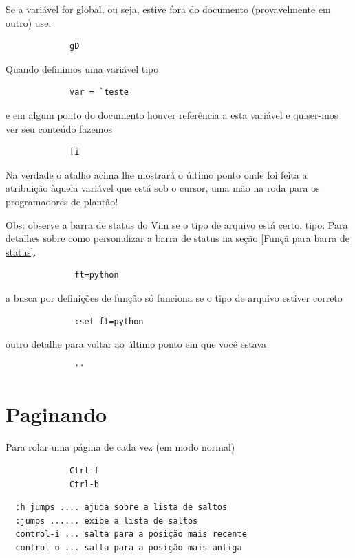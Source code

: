 \documentclass[10pt,a4paper,openany]{book}
\begin{document}
Se a variável for global, ou seja, estive fora do documento
(provavelmente em outro) use:

\begin{verbatim}
			 gD
\end{verbatim}

Quando definimos uma variável tipo

\begin{verbatim}
			 var = `teste'
\end{verbatim}

e em algum ponto do documento houver referência a esta variável e
quiser-mos ver seu conteúdo fazemos

\begin{verbatim}
			 [i
\end{verbatim}
Na verdade o atalho acima lhe mostrará o último ponto onde foi feita
a atribuição àquela variável que está sob o cursor, uma mão na roda
para os programadores de plantão!

Obs: observe a  barra de status do Vim se o tipo de arquivo está certo,
tipo. Para detalhes sobre como personalizar a barra de status na seção
\ref{Funçã para barra de status}.

\begin{verbatim}
			  ft=python
\end{verbatim}

a busca por definições de função só funciona se o tipo de arquivo
estiver correto

\begin{verbatim}
			  :set ft=python
\end{verbatim}

outro detalhe para voltar ao último ponto em que você estava

\begin{verbatim}
			  ''
\end{verbatim}

\section{Paginando}
\label{Paginando}

Para rolar uma página de cada vez (em modo normal)

\begin{verbatim}
			 Ctrl-f
			 Ctrl-b
\end{verbatim}


\begin{verbatim}
  :h jumps .... ajuda sobre a lista de saltos
  :jumps ...... exibe a lista de saltos
  control-i ... salta para a posição mais recente
  control-o ... salta para a posição mais antiga
\end{verbatim}
\end{document}
